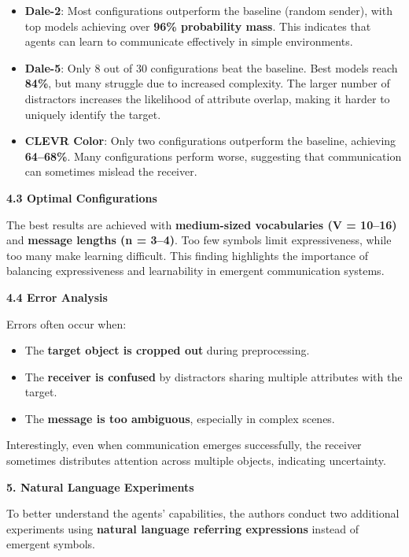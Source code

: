\documentclass[11pt]{article}
\def\tightlist{} %
\begin{document}
\begin{itemize}
\tightlist
\item
  \textbf{Dale-2}: Most configurations outperform the baseline (random
  sender), with top models achieving over \textbf{96\% probability
  mass}. This indicates that agents can learn to communicate effectively
  in simple environments.
\item
  \textbf{Dale-5}: Only 8 out of 30 configurations beat the baseline.
  Best models reach \textbf{84\%}, but many struggle due to increased
  complexity. The larger number of distractors increases the likelihood
  of attribute overlap, making it harder to uniquely identify the
  target.
\item
  \textbf{CLEVR Color}: Only two configurations outperform the baseline,
  achieving \textbf{64--68\%}. Many configurations perform worse,
  suggesting that communication can sometimes mislead the receiver.
\end{itemize}

\textbf{4.3 Optimal Configurations}

The best results are achieved with \textbf{medium-sized vocabularies (V
= 10--16)} and \textbf{message lengths (n = 3--4)}. Too few symbols
limit expressiveness, while too many make learning difficult. This
finding highlights the importance of balancing expressiveness and
learnability in emergent communication systems.

\textbf{4.4 Error Analysis}

Errors often occur when:

\begin{itemize}
\tightlist
\item
  The \textbf{target object is cropped out} during preprocessing.
\item
  The \textbf{receiver is confused} by distractors sharing multiple
  attributes with the target.
\item
  The \textbf{message is too ambiguous}, especially in complex scenes.
\end{itemize}

Interestingly, even when communication emerges successfully, the
receiver sometimes distributes attention across multiple objects,
indicating uncertainty.

\textbf{5. Natural Language Experiments}

To better understand the agents' capabilities, the authors conduct two
additional experiments using \textbf{natural language referring
expressions} instead of emergent symbols.
\end{document}
